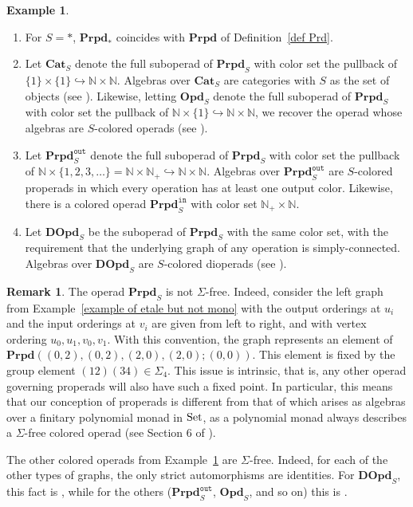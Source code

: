 \documentclass{amsart}
\numberwithin{theorem}{subsection}
\theoremstyle{definition}
\newtheorem{example}[theorem]{Example}
\newtheorem{remark}[theorem]{Remark}
\newcommand{\name}[1]{\ensuremath{\text{\textup{#1}}}}
\newcommand{\Set}{\name{Set}}
\newcommand{\out}{\mathtt{out}}
\newcommand{\inp}{\mathtt{in}}
\newcommand{\bfproperad}{\mathbf{Prpd}}
\begin{document}
\begin{example}\label{examples colored operads}
\leavevmode
	\begin{enumerate}
		\item For $S=*$, $\bfproperad_*$ coincides with $\bfproperad$ of Definition~\ref{def Prd}.
		\item Let $\mathbf{Cat}_S$ denote the full suboperad of $\bfproperad_S$ with color set the pullback of $ \{1\} \times \{1 \} \hookrightarrow \mathbb{N} \times \mathbb{N}$.
		Algebras over $\mathbf{Cat}_S$ are categories with $S$ as the set of objects (see \cite[2.1]{enriched}). Likewise, letting $\mathbf{Opd}_S$ denote the full suboperad of $\bfproperad_S$ with color set the pullback of $\mathbb{N}\times \{1 \} \hookrightarrow \mathbb{N} \times \mathbb{N}$, we recover the operad whose algebras are $S$-colored operads (see \cite[Definition 5.1.5]{ChuHaugseng}).
		\item Let $\bfproperad^{\out}_S$ denote the full suboperad of $\bfproperad_S$ with color set the pullback of $\mathbb{N} \times \{1, 2, 3, \dots \} = \mathbb{N} \times \mathbb{N}_+ \hookrightarrow \mathbb{N} \times \mathbb{N}$.
		Algebras over $\bfproperad^{\out}_S$ are $S$-colored properads in which every operation has at least one output color. Likewise, there is a colored operad $\bfproperad^{\inp}_S$ with color set $\mathbb{N}_+ \times \mathbb{N}$.
		\item Let $\mathbf{DOpd}_S$ be the suboperad of $\bfproperad_S$ with the same color set, with the requirement that the underlying graph of any operation is simply-connected.
		Algebras over $\mathbf{DOpd}_S$ are $S$-colored dioperads (see \cite[\S 11.5]{YauJohnson:FPAM}).
	\end{enumerate}
\end{example}

\begin{remark}\label{remark not sigma free}
The operad $\bfproperad_S$ is not $\Sigma$-free.
Indeed, consider the left graph from Example~\ref{example of etale but not mono} with the output orderings at $u_i$ and the input orderings at $v_i$ are given from left to right, and with vertex ordering $u_0, u_1, v_0, v_1$.
With this convention, the graph represents an element of $\bfproperad((0,2),(0,2),(2,0),(2,0); (0,0))$.
This element is fixed by the group element $(12)(34) \in \Sigma_4$.
This issue is intrinsic, that is, any other operad governing properads will also have such a fixed point.
In particular, this means that our conception of properads is different from that of \cite[10.4]{batanin-berger} which arises as algebras over a finitary polynomial monad in $\Set$, as a polynomial monad always describes a $\Sigma$-free colored operad (see Section 6 of \cite{batanin-berger}).

The other colored operads from Example~\ref{examples colored operads} are $\Sigma$-free.
Indeed, for each of the other types of graphs, the only strict automorphisms are identities.
For $\mathbf{DOpd}_S$, this fact is \cite[Proposition 4.14]{YauJohnson:FPAM}, while for the others ($\bfproperad^{\out}_S$, $\mathbf{Opd}_S$, and so on) this is \cite[Lemma 4.8]{YauJohnson:FPAM}.
\end{remark}
\end{document}
